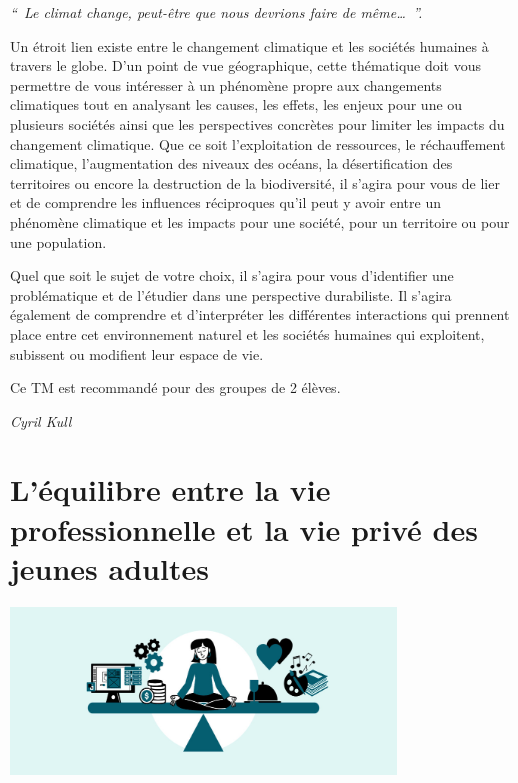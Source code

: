 \documentclass[
  10pt,
  french,
  a5paper,
  openany]{book}
\newenvironment{signature}{\begin{flushright}}{\end{flushright}}
\begin{document}

\emph{``~Le climat change, peut-être que nous devrions faire de même\ldots~''.}


Un étroit lien existe entre le changement climatique et les sociétés humaines à travers le globe. D'un point de vue géographique, cette thématique doit vous permettre de vous intéresser à un phénomène propre aux changements climatiques tout en analysant les causes, les effets, les enjeux pour une ou plusieurs sociétés ainsi que les perspectives concrètes pour limiter les impacts du changement climatique. Que ce soit l'exploitation de ressources, le réchauffement climatique, l'augmentation des niveaux des océans, la désertification des territoires ou encore la destruction de la biodiversité, il s'agira pour vous de lier et de comprendre les influences réciproques qu'il peut y avoir entre un phénomène climatique et les impacts pour une société, pour un territoire ou pour une population.

\clearpage

Quel que soit le sujet de votre choix, il s'agira pour vous d'identifier une problématique et de l'étudier dans une perspective durabiliste. Il s'agira également de comprendre et d'interpréter les différentes interactions qui prennent place entre cet environnement naturel et les sociétés humaines qui exploitent, subissent ou modifient leur espace de vie.

Ce TM est recommandé pour des groupes de 2 élèves.

\begin{signature}
\emph{Cyril Kull}

\end{signature}

\hypertarget{luxe9quilibre-entre-la-vie-professionnelle-et-la-vie-privuxe9-des-jeunes-adultes}{%
\chapter{\texorpdfstring{L'équilibre entre la vie professionnelle \linebreak et la vie privé des jeunes adultes}{L'équilibre entre la vie professionnelle et la vie privé des jeunes adultes}}\label{luxe9quilibre-entre-la-vie-professionnelle-et-la-vie-privuxe9-des-jeunes-adultes}}

\begin{center}
\includegraphics[width=\textwidth,height=12em]{images/equilibre-vie-professionnelle-prive-jeunes-adultes.jpg}

\end{center}
\end{document}
